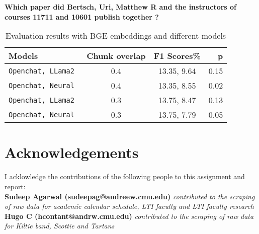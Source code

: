 \documentclass[11pt]{article}
\begin{document}
\textbf{Which paper did Bertsch, Uri, Matthew R and the instructors of courses 11711 and 10601 publish together ?}
\\

\begin{table}
  \centering
    \begin{tabular}{ l c c r }
    \hline
      \textbf{Models} & \textbf{Chunk overlap} &\textbf{F1 Scores\%} & \textbf{p}\\
      \hline
      \verb|Openchat, LLama2 | & 0.4 & 13.35, 9.64 & {0.15}\\
      \verb|Openchat, Neural | & 0.4 & 13.35, 8.55 & {0.02}\\ 
      \verb|Openchat, LLama2 | & 0.3 & 13.75, 8.47 & {0.13}\\
      \verb|Openchat, Neural | & 0.3 & 13.75, 7.79 & {0.05}\\
    \end{tabular}
  \caption{Evaluation results with BGE embeddings and different models}
  \label{tab:tab1}
\end{table}

\clearpage
\section*{Acknowledgements}
I acklowledge the contributions of the following people to this assignment and report:
\\
\textbf{Sudeep Agarwal (sudeepag@andreew.cmu.edu)} \textit{contributed to the scraping of raw data for academic calendar schedule, LTI faculty and LTI faculty research}
\\
\textbf{Hugo C (hcontant@andrw.cmu.edu)} \textit{contributed to the scraping of raw data for Kiltie band, Scottie and Tartans}


\end{document}
